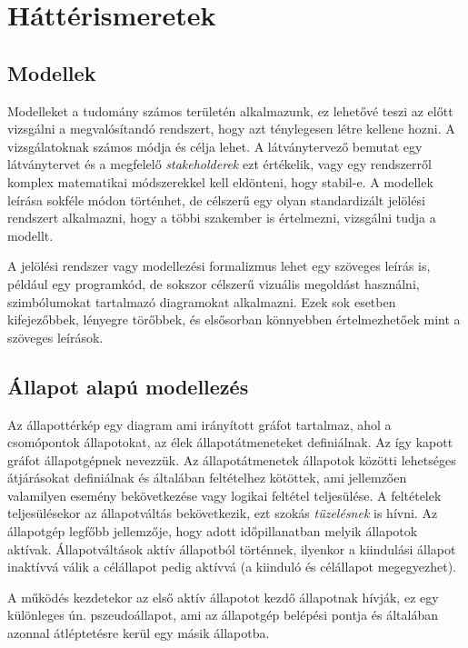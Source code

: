 \chapter{Háttérismeretek}\label{chap:hatter}
\section{Modellek}

Modelleket a tudomány számos területén alkalmazunk, ez lehetővé teszi az előtt vizsgálni a megvalósítandó rendszert, hogy azt ténylegesen létre kellene hozni. A vizsgálatoknak számos módja és célja lehet. A látványtervező bemutat egy látványtervet és a megfelelő \emph{stakeholderek} ezt értékelik, vagy egy rendszerről komplex matematikai módszerekkel kell eldönteni, hogy stabil-e. A modellek leírása sokféle módon történhet, de célszerű egy olyan standardizált jelölési rendszert alkalmazni, hogy a többi szakember is értelmezni, vizsgálni tudja a modellt.

A jelölési rendszer vagy modellezési formalizmus lehet egy szöveges leírás is, például egy programkód, de sokszor célszerű vizuális megoldást használni, szimbólumokat tartalmazó diagramokat alkalmazni. Ezek sok esetben kifejezőbbek, lényegre törőbbek, és elsősorban könnyebben értelmezhetőek mint a szöveges leírások.

\section{Állapot alapú modellezés}

Az állapottérkép egy diagram ami irányított gráfot tartalmaz, ahol a csomópontok állapotokat, az élek állapotátmeneteket definiálnak. Az így kapott gráfot állapotgépnek nevezzük. Az állapotátmenetek állapotok közötti lehetséges átjárásokat definiálnak és általában feltételhez kötöttek, ami jellemzően valamilyen esemény bekövetkezése vagy logikai feltétel teljesülése. A feltételek teljesülésekor az állapotváltás bekövetkezik, ezt szokás \emph{tüzelésnek} is hívni. Az állapotgép legfőbb jellemzője, hogy adott időpillanatban melyik állapotok aktívak. Állapotváltások aktív állapotból történnek, ilyenkor a kiindulási állapot inaktívvá válik a célállapot pedig aktívvá (a kiinduló és célállapot megegyezhet).

A működés kezdetekor az első aktív állapotot kezdő állapotnak hívják, ez egy különleges ún. pszeudoállapot, ami az állapotgép belépési pontja és általában azonnal átléptetésre kerül egy másik állapotba.

